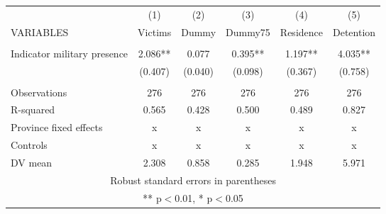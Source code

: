 \begin{tabular}{lccccc} \hline
 & (1) & (2) & (3) & (4) & (5) \\
VARIABLES & Victims & Dummy & Dummy75 & Residence & Detention \\ \hline
 &  &  &  &  &  \\
Indicator military presence & 2.086** & 0.077 & 0.395** & 1.197** & 4.035** \\
 & (0.407) & (0.040) & (0.098) & (0.367) & (0.758) \\
 &  &  &  &  &  \\
Observations & 276 & 276 & 276 & 276 & 276 \\
R-squared & 0.565 & 0.428 & 0.500 & 0.489 & 0.827 \\
Province fixed effects & x & x & x & x & x \\
Controls & x & x & x & x & x \\
 DV mean & 2.308 & 0.858 & 0.285 & 1.948 & 5.971 \\ \hline
\multicolumn{6}{c}{ Robust standard errors in parentheses} \\
\multicolumn{6}{c}{ ** p$<$0.01, * p$<$0.05} \\
\end{tabular}

